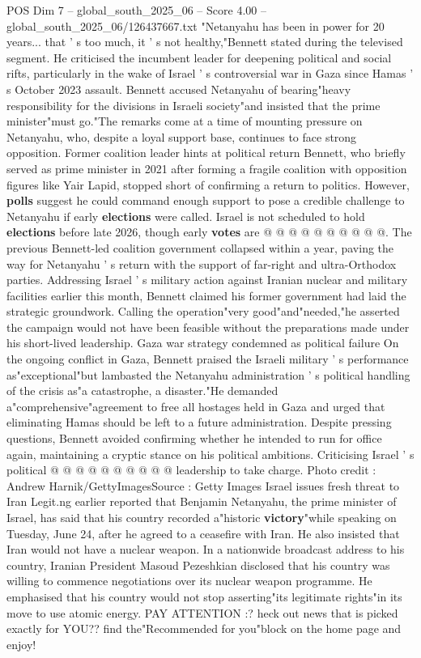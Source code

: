 \begin{textsample}{POS Dim 7 – global\_south\_2025\_06 – Score 4.00 – global\_south\_2025\_06/126437667.txt}  \label{ex:f7_pos_401}
"Netanyahu has been in power for 20 years... that ' s too much, it ' s not healthy,"Bennett stated during the televised segment.
He criticised the incumbent leader for deepening political and social rifts, particularly in the wake of Israel ' s controversial war in Gaza since Hamas ' s October 2023 assault.
Bennett accused Netanyahu of bearing"heavy responsibility for the divisions in Israeli society"and insisted that the prime minister"must go."The remarks come at a time of mounting pressure on Netanyahu, who, despite a loyal support base, continues to face strong opposition.
Former coalition leader hints at political return Bennett, who briefly served as prime minister in 2021 after forming a fragile coalition with opposition figures like Yair Lapid, stopped short of confirming a return to politics.
However, \textbf{polls} suggest he could command enough support to pose a credible challenge to Netanyahu if early \textbf{elections} were called.
Israel is not scheduled to hold \textbf{elections} before late 2026, though early \textbf{votes} are @ @ @ @ @ @ @ @ @ @.
The previous Bennett-led coalition government collapsed within a year, paving the way for Netanyahu ' s return with the support of far-right and ultra-Orthodox parties.
Addressing Israel ' s military action against Iranian nuclear and military facilities earlier this month, Bennett claimed his former government had laid the strategic groundwork.
Calling the operation"very good"and"needed,"he asserted the campaign would not have been feasible without the preparations made under his short-lived leadership.
Gaza war strategy condemned as political failure On the ongoing conflict in Gaza, Bennett praised the Israeli military ' s performance as"exceptional"but lambasted the Netanyahu administration ' s political handling of the crisis as"a catastrophe, a disaster."He demanded a"comprehensive"agreement to free all hostages held in Gaza and urged that eliminating Hamas should be left to a future administration.
Despite pressing questions, Bennett avoided confirming whether he intended to run for office again, maintaining a cryptic stance on his political ambitions.
Criticising Israel ' s political @ @ @ @ @ @ @ @ @ @ leadership to take charge.
Photo credit : Andrew Harnik/GettyImagesSource : Getty Images Israel issues fresh threat to Iran Legit.ng earlier reported that Benjamin Netanyahu, the prime minister of Israel, has said that his country recorded a"historic \textbf{victory}"while speaking on Tuesday, June 24, after he agreed to a ceasefire with Iran.
He also insisted that Iran would not have a nuclear weapon.
In a nationwide broadcast address to his country, Iranian President Masoud Pezeshkian disclosed that his country was willing to commence negotiations over its nuclear weapon programme.
He emphasised that his country would not stop asserting"its legitimate rights"in its move to use atomic energy.
PAY ATTENTION :? heck out news that is picked exactly for YOU?? find the"Recommended for you"block on the home page and enjoy!

\end{textsample}
